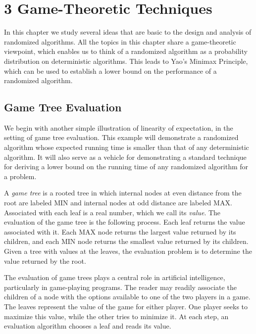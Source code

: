 \documentclass[twoside,12pt]{book}
\theoremstyle{plain}
\theoremstyle{definition}
\theoremstyle{remark}
\begin{document}
\chapter*{3 Game-Theoretic Techniques}
\label{ch:game-theoretic}

In this chapter we study several ideas that are basic to the design and
analysis of randomized algorithms.  All the topics in this chapter share a
game-theoretic viewpoint, which enables us to think of a randomized algorithm
as a probability distribution on deterministic algorithms.  This leads to
Yao's Minimax Principle, which can be used to establish a lower bound on the
performance of a randomized algorithm.

\section{Game Tree Evaluation}
\label{sec:gametree}

We begin with another simple illustration of linearity of expectation, in the
setting of game tree evaluation.  This example will demonstrate a randomized
algorithm whose expected running time is smaller than that of any
deterministic algorithm.  It will also serve as a vehicle for demonstrating a
standard technique for deriving a lower bound on the running time of any
randomized algorithm for a problem.

A \emph{game tree} is a rooted tree in which internal nodes at even distance
from the root are labeled MIN and internal nodes at odd distance are labeled
MAX.  Associated with each leaf is a real number, which we call its
\emph{value}.  The evaluation of the game tree is the following process.
Each leaf returns the value associated with it.  Each MAX node returns the
largest value returned by its children, and each MIN node returns the smallest
value returned by its children.  Given a tree with values at the leaves, the
evaluation problem is to determine the value returned by the root.

The evaluation of game trees plays a central role in artificial intelligence,
particularly in game-playing programs.  The reader may readily associate the
children of a node with the options available to one of the two players in a
game.  The leaves represent the value of the game for either player.  One
player seeks to maximize this value, while the other tries to minimize it.
At each step, an evaluation algorithm chooses a leaf and reads its value.
\end{document}
